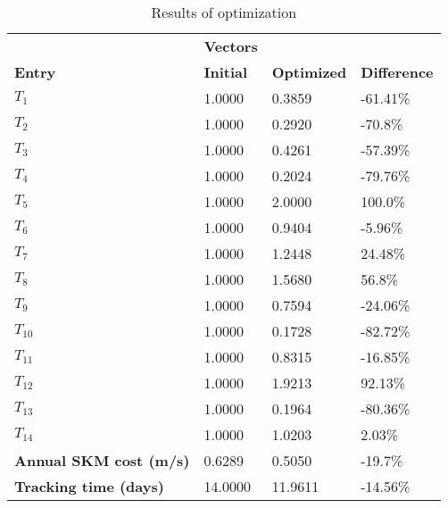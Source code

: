 \begin{table}[H]
\centering
\begin{tabular}{llll}
\textbf{}      & \cellcolor[HTML]{EFEFEF}\textbf{Vectors} & \textbf{} & \textbf{}         \\
\rowcolor[HTML]{EFEFEF} 
\textbf{Entry} & \textbf{Initial} & \textbf{Optimized} & \textbf{Difference} \\
$T_1$ & 1.0000 & 0.3859 & -61.41\% \\ 
$T_2$ & 1.0000 & 0.2920 & -70.8\% \\ 
$T_3$ & 1.0000 & 0.4261 & -57.39\% \\ 
$T_4$ & 1.0000 & 0.2024 & -79.76\% \\ 
$T_5$ & 1.0000 & 2.0000 & 100.0\% \\ 
$T_6$ & 1.0000 & 0.9404 & -5.96\% \\ 
$T_7$ & 1.0000 & 1.2448 & 24.48\% \\ 
$T_8$ & 1.0000 & 1.5680 & 56.8\% \\ 
$T_9$ & 1.0000 & 0.7594 & -24.06\% \\ 
$T_10$ & 1.0000 & 0.1728 & -82.72\% \\ 
$T_11$ & 1.0000 & 0.8315 & -16.85\% \\ 
$T_12$ & 1.0000 & 1.9213 & 92.13\% \\ 
$T_13$ & 1.0000 & 0.1964 & -80.36\% \\ 
$T_14$ & 1.0000 & 1.0203 & 2.03\% \\ 
\rowcolor[HTML]{EFEFEF} 
\textbf{Annual SKM cost (m/s)}  & 0.6289 & 0.5050 & -19.7\% \\ 
\rowcolor[HTML]{EFEFEF} 
\textbf{Tracking time (days)}  & 14.0000 & 11.9611 & -14.56\% \\ 
\end{tabular}
\caption{Results of optimization}
\label{tab:OptimizationAnalysis}
\end{table}